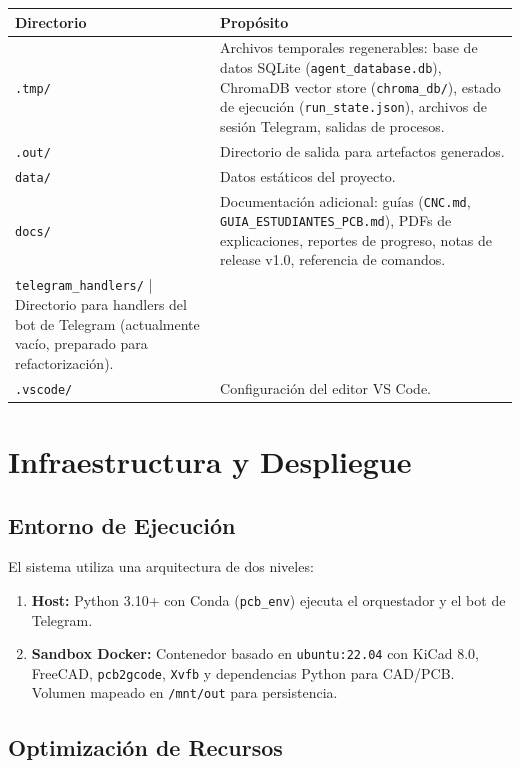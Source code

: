\documentclass[12pt, a4paper]{article}
\begin{document}
\begin{longtable}{|p{3.5cm}|p{10.5cm}|}
\hline
\textbf{Directorio} & \textbf{Propósito} \\
\hline
\endhead
\texttt{.tmp/} & Archivos temporales regenerables: base de datos SQLite (\texttt{agent\_database.db}), ChromaDB vector store (\texttt{chroma\_db/}), estado de ejecución (\texttt{run\_state.json}), archivos de sesión Telegram, salidas de procesos. \\
\hline
\texttt{.out/} & Directorio de salida para artefactos generados. \\
\hline
\texttt{data/} & Datos estáticos del proyecto. \\
\hline
\texttt{docs/} & Documentación adicional: guías (\texttt{CNC.md}, \texttt{GUIA\_ESTUDIANTES\_PCB.md}), PDFs de explicaciones, reportes de progreso, notas de release v1.0, referencia de comandos. \\
\hline
\texttt{telegram\_handlers/} | Directorio para handlers del bot de Telegram (actualmente vacío, preparado para refactorización). \\
\hline
\texttt{.vscode/} & Configuración del editor VS Code. \\
\hline
\end{longtable}

\section{Infraestructura y Despliegue}

\subsection{Entorno de Ejecución}

El sistema utiliza una arquitectura de dos niveles:
\begin{enumerate}[leftmargin=*]
    \item \textbf{Host:} Python 3.10+ con Conda (\texttt{pcb\_env}) ejecuta el orquestador y el bot de Telegram.
    \item \textbf{Sandbox Docker:} Contenedor basado en \texttt{ubuntu:22.04} con KiCad 8.0, FreeCAD, \texttt{pcb2gcode}, \texttt{Xvfb} y dependencias Python para CAD/PCB. Volumen mapeado en \texttt{/mnt/out} para persistencia.
\end{enumerate}

\subsection{Optimización de Recursos}
\end{document}
